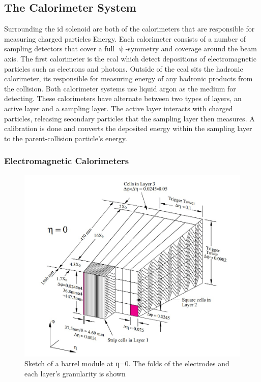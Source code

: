 \subsection{The Calorimeter System}
Surrounding the \gls{id} solenoid are both of the calorimeters that are responsible for measuring charged particles Energy.
Each calorimeter consists of a number of sampling detectors that cover a full $\uppsi$-symmetry and coverage around the beam axis.
The first calorimeter is the \gls{ecal} which detect depositions of electromagnetic particles such as electrons 
and photons. Outside of the \gls{ecal} sits the hadronic calorimeter, its responsible for measuring energy of any hadronic products 
from the collision. Both calorimeter systems use liquid argon as the medium for detecting. These calorimeters have alternate between two 
types of layers, an active layer and a sampling layer. The active layer interacts with charged particles, releasing secondary particles 
that the sampling layer then measures. A calibration is done and converts the deposited energy within the sampling layer to the parent-collision 
particle's energy. 


\subsubsection{Electromagnetic Calorimeters}

\begin{figure}[h]
  \centering
  \includegraphics[scale=0.5]{figs/ch3/barrel_module.jpg}
  \caption{  Sketch of a barrel module at η=0. The folds of the electrodes and each layer's granularity is shown \cite{atlas}}
\label{fig:3.9}
\end{figure}
\par

